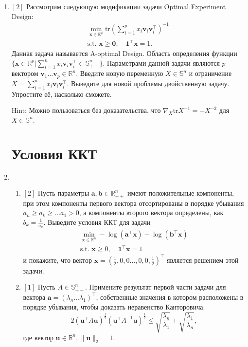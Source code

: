 \documentclass{article}
\begin{document}
\begin{enumerate}
    \item $[2]$  Рассмотрим следующую модификации задачи Optimal Experiment Design:
        \begin{equation*}
        \begin{aligned}
      \min_{\mathbf{x}\in\mathbb{R}^p} \text{tr}\left(\sum\limits_{i=1}^p x_i \mathbf{v}_i \mathbf{v}_i^\top\right)^{-1} \\
        \text{s.t. } \mathbf{x}\geq\mathbf{0}, \quad \mathbf{1}^\top \mathbf{x}=1.
        \end{aligned}
    \end{equation*}
    Данная задача называется A-optimal Design. Область определения функции $\{\mathbf{x}\in\mathbb{R}^p |\sum\limits_{i=1}^n x_i \mathbf{v}_i \mathbf{v}_i^\top\in\mathbb{S}^n_{++}\}$. Параметрами данной задачи являются $p$ вектором $\mathbf{v}_1\dots \mathbf{v}_p\in\mathbb{R}^n$. Введите новую переменную $X\in\mathbb{S}^n$ и ограничение $X = \sum\limits_{i=1}^n x_i \mathbf{v}_i \mathbf{v}_i^\top$. Выведите для новой проблемы двойственную задачу. Упростите её, насколько сможете.
    
            Hint: Можно пользоваться без доказательства, что $\nabla_X\text{tr}X^{-1}=-X^{-2}$ для $X\in\mathbb{S}^n$.
\section{Условия ККТ}

\item   \begin{enumerate}[label=\alph*)]
        \item $[2]$ Пусть параметры $\mathbf{a},\mathbf{b}\in\mathbb{R}^n_{++}$ имеют положительные компоненты,  при этом компоненты первого вектора отсортированы в порядке убывания $a_n\geq a_k \geq \dots a_1 > 0$, а компоненты второго вектора определены, как $b_k=\frac{1}{a_k}$. Выведите условия ККТ для задачи
        \begin{equation*}
        \begin{aligned}
      \min_{\mathbf{x}\in\mathbb{R}^n} -\log(\mathbf{a}^\top \mathbf{x})-\log(\mathbf{b}^\top \mathbf{x})\\
              \text{s.t. } \mathbf{x}\geq 0,\quad \mathbf{1}^\top \mathbf{x}=1
        \end{aligned}
    \end{equation*}  
    и покажите, что вектор $\mathbf{x}=\left(\frac{1}{2}, 0, 0\dots, 0, 0, \frac{1}{2}\right)^\top$ является решением этой задачи.
        \item $[1]$ Пусть $A\in\mathbb{S}^n_{++}$. Примените результат первой части задачи для вектора $\mathbf{a}=(\lambda_n\dots \lambda_1)^\top$, собственные значения в котором расположены в порядке убывания, чтобы доказать неравенство Канторовича:
        $$2\left(\mathbf{u}^\top A\mathbf{u}\right)^{\frac{1}{2}}\left(\mathbf{u}^\top A^{-1}\mathbf{u}\right)^{\frac{1}{2}}\leq \sqrt{\frac{\lambda_{n}}{\lambda_1}}+\sqrt{\frac{\lambda_{1}}{\lambda_n}},$$
        где вектор $\mathbf{u}\in\mathbb{R}^n, \|\mathbf{u}\|_2=1$.
        

\end{enumerate}
\end{enumerate}
\end{document}
